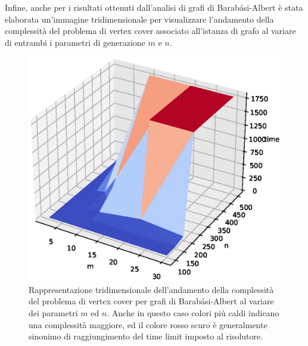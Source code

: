 Infine, anche per i risultati ottenuti dall'analisi di grafi di Barabási-Albert è stata elaborata un'immagine tridimensionale per visualizzare l'andamento della complessità del problema di vertex cover associato all'istanza di grafo al variare di entrambi i parametri di generazione $m$ e $n$.
  \vspace{-1cm}  
\begin{figure}[h!]
     \centering
       \includegraphics[scale=0.4]{images/bag-3d.eps}
       \vspace{-0.8cm}  
       \caption{Rappresentazione tridimensionale dell'andamento della complessità del problema di vertex cover per grafi di Barabási-Albert al variare dei parametri $m$ ed $n$. Anche in questo caso colori più caldi indicano una complessità maggiore, ed il colore rosso scuro è generalmente sinonimo di raggiungimento del time limit imposto al risolutore.}      
        \label{fig:bag3d}
\end{figure}